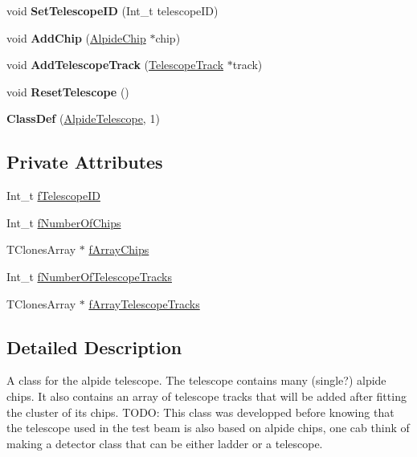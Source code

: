 \begin{DoxyCompactItemize}
void {\bfseries Set\+Telescope\+ID} (Int\+\_\+t telescope\+ID)
\item 
\mbox{\label{class_alpide_telescope_a5c0d36c8e07025ea25e56daac3a5abe5}} 
void {\bfseries Add\+Chip} (\mbox{\hyperlink{class_alpide_chip}{Alpide\+Chip}} $\ast$chip)
\item 
\mbox{\label{class_alpide_telescope_a7057a801f20d2178e09930298a18b3f7}} 
void {\bfseries Add\+Telescope\+Track} (\mbox{\hyperlink{class_telescope_track}{Telescope\+Track}} $\ast$track)
\item 
\mbox{\label{class_alpide_telescope_a1fe138a228c478c7ec8f038b141ff29b}} 
void {\bfseries Reset\+Telescope} ()
\item 
\mbox{\label{class_alpide_telescope_a0389541f27e727fe4f6cbd096d156e89}} 
{\bfseries Class\+Def} (\mbox{\hyperlink{class_alpide_telescope}{Alpide\+Telescope}}, 1)
\end{DoxyCompactItemize}
\subsection*{Private Attributes}
\begin{DoxyCompactItemize}
\item 
Int\+\_\+t \mbox{\hyperlink{class_alpide_telescope_a9b885e9e99ae303294ba02f3bacd049b}{f\+Telescope\+ID}}
\item 
Int\+\_\+t \mbox{\hyperlink{class_alpide_telescope_ada9d09d4e2e419ab4c8da7a3da8f6395}{f\+Number\+Of\+Chips}}
\item 
T\+Clones\+Array $\ast$ \mbox{\hyperlink{class_alpide_telescope_aa660d33d3521ba7aa21930120e05e0cd}{f\+Array\+Chips}}
\item 
Int\+\_\+t \mbox{\hyperlink{class_alpide_telescope_a5767a235a504a73169601284b7f2f55c}{f\+Number\+Of\+Telescope\+Tracks}}
\item 
T\+Clones\+Array $\ast$ \mbox{\hyperlink{class_alpide_telescope_a98c999ffa985cf1161d8e17a0a1b2b0d}{f\+Array\+Telescope\+Tracks}}
\end{DoxyCompactItemize}


\subsection{Detailed Description}
A class for the alpide telescope. The telescope contains many (single?) alpide chips. It also contains an array of telescope tracks that will be added after fitting the cluster of its chips. T\+O\+DO\+: This class was developped before knowing that the telescope used in the test beam is also based on alpide chips, one cab think of making a detector class that can be either ladder or a telescope. 

